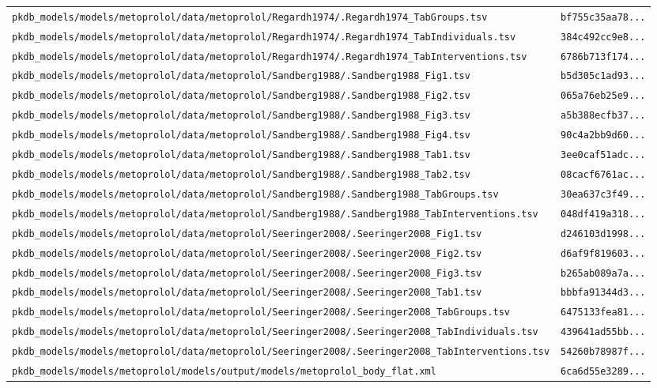 \documentclass{article}
\begin{document}
\begin{longtable}{ll}
\texttt{pkdb\_models/models/metoprolol/data/metoprolol/Regardh1974/.Regardh1974\_TabGroups.tsv} & \texttt{bf755c35aa78...} \\
\texttt{pkdb\_models/models/metoprolol/data/metoprolol/Regardh1974/.Regardh1974\_TabIndividuals.tsv} & \texttt{384c492cc9e8...} \\
\texttt{pkdb\_models/models/metoprolol/data/metoprolol/Regardh1974/.Regardh1974\_TabInterventions.tsv} & \texttt{6786b713f174...} \\
\texttt{pkdb\_models/models/metoprolol/data/metoprolol/Sandberg1988/.Sandberg1988\_Fig1.tsv} & \texttt{b5d305c1ad93...} \\
\texttt{pkdb\_models/models/metoprolol/data/metoprolol/Sandberg1988/.Sandberg1988\_Fig2.tsv} & \texttt{065a76eb25e9...} \\
\texttt{pkdb\_models/models/metoprolol/data/metoprolol/Sandberg1988/.Sandberg1988\_Fig3.tsv} & \texttt{a5b388ecfb37...} \\
\texttt{pkdb\_models/models/metoprolol/data/metoprolol/Sandberg1988/.Sandberg1988\_Fig4.tsv} & \texttt{90c4a2bb9d60...} \\
\texttt{pkdb\_models/models/metoprolol/data/metoprolol/Sandberg1988/.Sandberg1988\_Tab1.tsv} & \texttt{3ee0caf51adc...} \\
\texttt{pkdb\_models/models/metoprolol/data/metoprolol/Sandberg1988/.Sandberg1988\_Tab2.tsv} & \texttt{08cacf6761ac...} \\
\texttt{pkdb\_models/models/metoprolol/data/metoprolol/Sandberg1988/.Sandberg1988\_TabGroups.tsv} & \texttt{30ea637c3f49...} \\
\texttt{pkdb\_models/models/metoprolol/data/metoprolol/Sandberg1988/.Sandberg1988\_TabInterventions.tsv} & \texttt{048df419a318...} \\
\texttt{pkdb\_models/models/metoprolol/data/metoprolol/Seeringer2008/.Seeringer2008\_Fig1.tsv} & \texttt{d246103d1998...} \\
\texttt{pkdb\_models/models/metoprolol/data/metoprolol/Seeringer2008/.Seeringer2008\_Fig2.tsv} & \texttt{d6af9f819603...} \\
\texttt{pkdb\_models/models/metoprolol/data/metoprolol/Seeringer2008/.Seeringer2008\_Fig3.tsv} & \texttt{b265ab089a7a...} \\
\texttt{pkdb\_models/models/metoprolol/data/metoprolol/Seeringer2008/.Seeringer2008\_Tab1.tsv} & \texttt{bbbfa91344d3...} \\
\texttt{pkdb\_models/models/metoprolol/data/metoprolol/Seeringer2008/.Seeringer2008\_TabGroups.tsv} & \texttt{6475133fea81...} \\
\texttt{pkdb\_models/models/metoprolol/data/metoprolol/Seeringer2008/.Seeringer2008\_TabIndividuals.tsv} & \texttt{439641ad55bb...} \\
\texttt{pkdb\_models/models/metoprolol/data/metoprolol/Seeringer2008/.Seeringer2008\_TabInterventions.tsv} & \texttt{54260b78987f...} \\
\texttt{pkdb\_models/models/metoprolol/models/output/models/metoprolol\_body\_flat.xml} & \texttt{6ca6d55e3289...} \\
\end{longtable}
\end{document}
